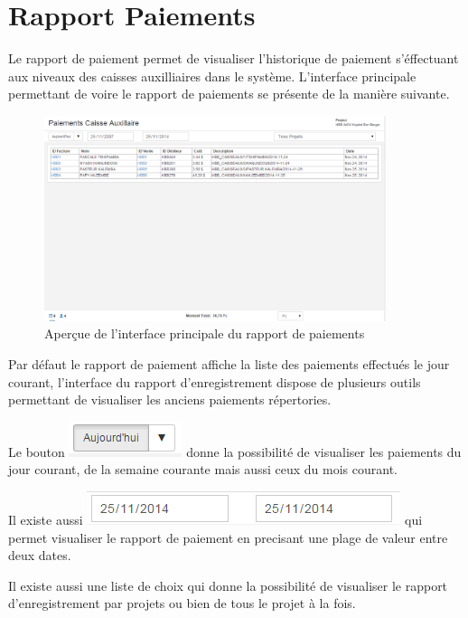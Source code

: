 \documentclass[12pt,a4paper]{report}
\begin{document}
\newpage
\section{Rapport Paiements}
Le rapport de paiement permet de visualiser l'historique de paiement s'éffectuant aux niveaux des caisses auxilliaires dans le système. L'interface principale permettant de voire le rapport de paiements se présente de la manière suivante. 

\begin{figure}[h]
\begin{center}
\includegraphics[width=10cm]{pic/rapportCaisseAux.png}
\end{center}
\caption{Aperçue de l'interface principale du rapport de paiements}
\label{Aperçue de l'interface principale du rapport de paiements}
\end{figure}

Par défaut le rapport de paiement affiche la liste des paiements effectués le jour courant, l'interface du rapport d'enregistrement dispose de plusieurs outils permettant de visualiser les anciens paiements répertories.

Le bouton \includegraphics[scale=0.7]{pic/Todays.png} donne la possibilité de visualiser les paiements du jour courant, de la semaine courante mais aussi ceux du mois courant. 

Il existe aussi  \includegraphics[scale=0.7]{pic/PlageTimes.png} qui permet visualiser le rapport de paiement en precisant une plage de valeur entre deux dates.

Il existe aussi une liste de choix qui donne la possibilité de visualiser le rapport d'enregistrement par projets ou bien de tous le projet à la fois.
\end{document}

